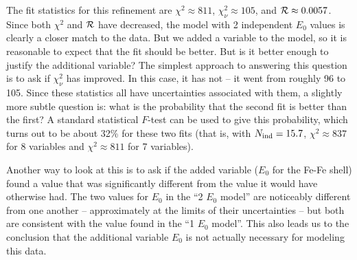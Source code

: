 The fit statistics for this refinement are $\chi^2 \approx 811$,
$\chi^2_\nu \approx 105$, and ${\cal{R}} \approx 0.0057$.  Since both
$\chi^2$ and $\cal{R}$ have decreased, the model with 2 independent $E_0$
values is clearly a closer match to the data.  But we added a variable to
the model, so it is reasonable to expect that the fit should be better.
But is it better enough to justify the additional variable?  The simplest
approach to answering this question is to ask if $\chi^2_\nu$ has improved.
In this case, it has not -- it went from roughly 96 to 105.  Since these
statistics all have uncertainties associated with them, a slightly more
subtle question is: what is the probability that the second fit is better
than the first?  A standard statistical $F$-test can be used to give this
probability, which turns out to be about 32\% for these two fits (that is,
with $N_{\rm ind}=15.7$, $\chi^2 \approx 837$ for 8 variables and $\chi^2
\approx 811$ for 7 variables).

Another way to look at this is to ask if the added variable ($E_0$ for the
Fe-Fe shell) found a value that was significantly different from the value
it would have otherwise had.  The two values for $E_0$ in the ``2 $E_0$
model'' are noticeably different from one another -- approximately at the
limits of their uncertainties -- but both are consistent with the value
found in the ``1 $E_0$ model''.  This also leads us to the conclusion that
the additional variable $E_0$ is not actually necessary for modeling this
data.

